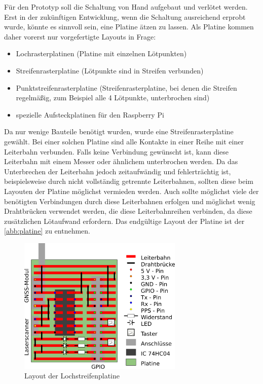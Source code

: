 \documentclass[a4paper,12pt,bibliography=totoc, listof=totoc,titlepage,pointlessnumbers]{scrreprt}
\begin{document}
Für den Prototyp soll die Schaltung von Hand aufgebaut und verlötet werden. Erst in der zukünftigen Entwicklung, wenn die Schaltung ausreichend erprobt wurde, könnte es sinnvoll sein, eine Platine ätzen zu lassen. Als Platine kommen daher vorerst nur vorgefertigte Layouts in Frage:

\begin{itemize}
 \item Lochrasterplatinen (Platine mit einzelnen Lötpunkten)
 \item Streifenrasterplatine (Lötpunkte sind in Streifen verbunden)
 \item Punktstreifenrasterplatine (Streifenrasterplatine, bei denen die Streifen regelmäßig, zum Beispiel alle 4 Lötpunkte, unterbrochen sind)
 \item spezielle Aufsteckplatinen für den Raspberry Pi
\end{itemize}


Da nur wenige Bauteile benötigt wurden, wurde eine Streifenrasterplatine gewählt. Bei einer solchen Platine sind alle Kontakte in einer Reihe mit einer Leiterbahn verbunden. Falls keine Verbindung gewünscht ist, kann diese Leiterbahn mit einem Messer oder ähnlichem unterbrochen werden. Da das Unterbrechen der Leiterbahn jedoch zeitaufwändig und fehlerträchtig ist, beispielsweise durch nicht vollständig getrennte Leiterbahnen, sollten diese beim Layouten der Platine möglichst vermieden werden. Auch sollte möglichst viele der benötigten Verbindungen durch diese Leiterbahnen erfolgen und möglichst wenig Drahtbrücken verwendet werden, die diese Leiterbahnreihen verbinden, da diese zusätzlichen Lötaufwand erfordern. Das endgültige Layout der Platine ist der \autoref{abb:platine} zu entnehmen.

\begin{figure}
 \centering
 \includegraphics[width=0.7\textwidth]{img/platine.png}
 \caption{Layout der Lochstreifenplatine}
 \label{abb:platine}
\end{figure}
\end{document}
